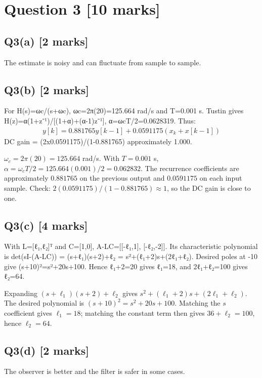 \documentclass[11pt,a4paper]{article}
\begin{document}
\section*{Question 3 \hfill [10 marks]}
\subsection*{Q3(a) \hfill [2 marks]}

The estimate is noisy and can fluctuate from sample to sample.

\subsection*{Q3(b) \hfill [2 marks]}

For H(s)=ωc/(s+ωc), ωc=2π(20)=125.664 rad/s and T=0.001 s.
Tustin gives H(z)=α(1+z⁻¹)/[(1+α)+(α-1)z⁻¹], α=ωcT/2=0.0628319.
Thus:\[\begin{aligned}y[k]=0.881765y[k-1]+0.0591175(x_k+x[k-1])\end{aligned}\]
DC gain = (2x0.0591175)/(1-0.881765) approximately 1.000.\par\smallskip $\omega_c=2\pi(20)=125.664$ rad/s. With $T=0.001$ s, $\alpha=\omega_cT/2=125.664(0.001)/2=0.062832$. The recurrence coefficients are approximately $0.881765$ on the previous output and $0.0591175$ on each input sample. Check: $2(0.0591175)/(1-0.881765)\approx1$, so the DC gain is close to one.

\subsection*{Q3(c) \hfill [4 marks]}

With L=[ℓ₁,ℓ₂]ᵀ and C=[1,0], A-LC=[[-ℓ₁,1], [-ℓ₂,-2]].
Its characteristic polynomial is det(sI-(A-LC)) = (s+ℓ₁)(s+2)+ℓ₂ = s²+(ℓ₁+2)s+(2ℓ₁+ℓ₂).
Desired poles at -10 give (s+10)²=s²+20s+100.
Hence ℓ₁+2=20 gives ℓ₁=18, and 2ℓ₁+ℓ₂=100 gives ℓ₂=64.\par\smallskip Expanding $(s+\ell_1)(s+2)+\ell_2$ gives $s^2+(\ell_1+2)s+(2\ell_1+\ell_2)$. The desired polynomial is $(s+10)^2=s^2+20s+100$. Matching the $s$ coefficient gives $\ell_1=18$; matching the constant term then gives $36+\ell_2=100$, hence $\ell_2=64$.

\subsection*{Q3(d) \hfill [2 marks]}

The observer is better and the filter is safer in some cases.
\end{document}
